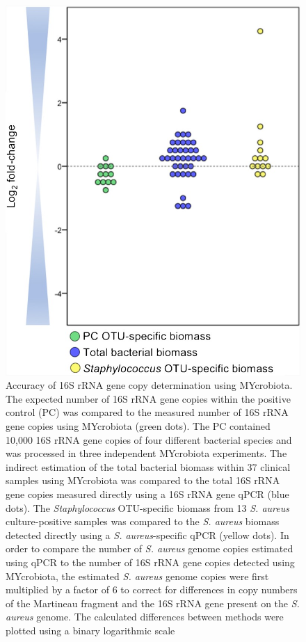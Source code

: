 \begin{figure}[t!]
\centering
\includegraphics[scale=0.5]{chapters/images/mycrobiota/mycrobiota-fig2.jpg}
\caption{Accuracy of 16S rRNA gene copy determination using MYcrobiota. The expected number of 16S rRNA gene copies within the positive control (PC) was compared to the measured number of 16S rRNA gene copies using MYcrobiota (green dots). The PC contained 10,000 16S rRNA gene copies of four different bacterial species and was processed in three independent MYcrobiota experiments. The indirect estimation of the total bacterial biomass within 37 clinical samples using MYcrobiota was compared to the total 16S rRNA gene copies measured directly using a 16S rRNA gene qPCR (blue dots). The \textit{Staphylococcus} OTU-specific biomass from 13 \textit{S. aureus} culture-positive samples was compared to the \textit{S. aureus} biomass detected directly using a \textit{S. aureus}-specific qPCR (yellow dots). In order to compare the number of \textit{S. aureus} genome copies estimated using qPCR to the number of 16S rRNA gene copies detected using MYcrobiota, the estimated \textit{S. aureus} genome copies were first multiplied by a factor of 6 to correct for differences in copy numbers of the Martineau fragment and the 16S rRNA gene present on the \textit{S. aureus} genome. The calculated differences between methods were plotted using a binary logarithmic scale}
\label{fig:accuracy}
\end{figure}


